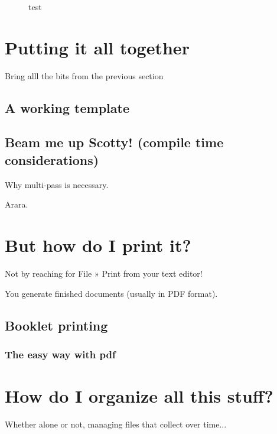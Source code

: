 \documentclass[12pt]{scrartcl}
\begin{document}
\begin{figure}
	test
\end{figure}

\begin{ExampleCode}[showframe]
\usepackage{showframe}
\end{ExampleCode}

\section{Putting it all together}

Bring alll the bits from the previous section

\subsection{A working template}

%

\subsection{Beam me up Scotty! (compile time considerations)}

Why multi-pass is necessary.

Arara.

\section{But how do I print it?}

Not by reaching for File » Print from your text editor!

You generate finished documents (usually in PDF format).

\subsection{Booklet printing}

\subsubsection{The easy way with pdf}

\section{How do I organize all this stuff?}

Whether alone or not, managing files that collect over time...
\end{document}
